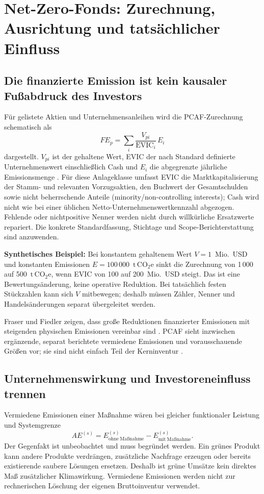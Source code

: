 \documentclass[11pt,a4paper]{article}
\newcommand{\tonnen}{\ensuremath{\mathrm{t\,CO}_{2}\mathrm{e}}}
\begin{document}
\section{Net-Zero-Fonds: Zurechnung, Ausrichtung und tatsächlicher Einfluss}
\label{sec:portfolio}
\subsection{Die finanzierte Emission ist kein kausaler Fußabdruck des Investors}
Für gelistete Aktien und Unternehmensanleihen wird die PCAF-Zurechnung schematisch als
\begin{equation}
FE_p=\sum_i\frac{V_{pi}}{\mathrm{EVIC}_i}\,E_i
\end{equation}
dargestellt. $V_{pi}$ ist der gehaltene Wert, EVIC der nach Standard definierte Unternehmenswert einschließlich Cash und $E_i$ die abgegrenzte jährliche Emissionsmenge \cite{pcaf2025}. Für diese Anlageklasse umfasst EVIC die Marktkapitalisierung der Stamm- und relevanten Vorzugsaktien, den Buchwert der Gesamtschulden sowie nicht beherrschende Anteile (minority/non-controlling interests); Cash wird nicht wie bei einer üblichen Netto-Unternehmenswertkennzahl abgezogen. Fehlende oder nichtpositive Nenner werden nicht durch willkürliche Ersatzwerte repariert. Die konkrete Standardfassung, Stichtage und Scope-Berichterstattung sind anzuwenden.

\textbf{Synthetisches Beispiel:} Bei konstantem gehaltenem Wert $V=1$~Mio.~USD und konstanten Emissionen $E=100\,000$~\tonnen{} sinkt die Zurechnung von 1\,000 auf 500~\tonnen, wenn EVIC von 100 auf 200~Mio.~USD steigt. Das ist eine Bewertungsänderung, keine operative Reduktion. Bei tatsächlich festen Stückzahlen kann sich $V$ mitbewegen; deshalb müssen Zähler, Nenner und Handelsänderungen separat übergeleitet werden.

Fraser und Fiedler zeigen, dass große Reduktionen finanzierter Emissionen mit steigenden physischen Emissionen vereinbar sind \cite{fraser2023}. PCAF sieht inzwischen ergänzende, separat berichtete vermiedene Emissionen und vorausschauende Größen vor; sie sind nicht einfach Teil der Kerninventur \cite{pcaf2025}.

\subsection{Unternehmenswirkung und Investoreneinfluss trennen}
Vermiedene Emissionen einer Maßnahme wären bei gleicher funktionaler Leistung und Systemgrenze
\begin{equation}
AE^{(s)}=E_{\mathrm{ohne\ Maßnahme}}^{(s)}-E_{\mathrm{mit\ Maßnahme}}^{(s)}.
\end{equation}
Der Gegenfakt ist unbeobachtet und muss begründet werden. Ein grünes Produkt kann andere Produkte verdrängen, zusätzliche Nachfrage erzeugen oder bereits existierende saubere Lösungen ersetzen. Deshalb ist \glqq grüne Umsätze\grqq{} kein direktes Maß zusätzlicher Klimawirkung. Vermiedene Emissionen werden nicht zur rechnerischen Löschung der eigenen Bruttoinventur verwendet.
\end{document}
